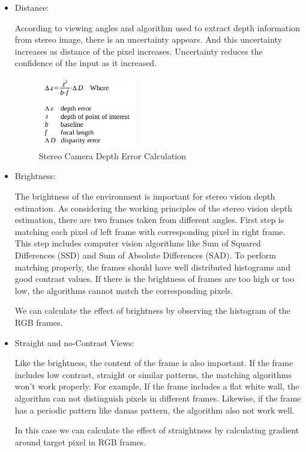 \documentclass[12pt]{article}
\begin{document}
\begin{itemize}
    \item Distance:

          According to viewing angles and algorithm used to extract depth information from stereo image, there is an uncertainty appears. And this uncertainty increases as distance of the pixel increases. Uncertainty reduces the confidence of the input as it increased.

          \begin{figure}[H]
              \centering
              \includegraphics[width=0.4\textwidth]{CamDistance.png}
              \caption{Stereo Camera Depth Error Calculation~\cite{DisparityCalculator, gallup2008variable}}
          \end{figure}

    \item Brightness:

          The brightness of the environment is important for stereo vision depth estimation. As considering the working principles of the stereo vision depth estimation, there are two frames taken from different angles. First step is matching each pixel of left frame with corresponding pixel in right frame. This step includes computer vision algorithms like Sum of Squared Differences (SSD) and Sum of Absolute Differences (SAD). To perform matching properly, the frames should have well distributed histograms and good contrast values. If there is the brightness of frames are too high or too low, the algorithms cannot match the corresponding pixels.

          We can calculate the effect of brightness by observing the histogram of the RGB frames.
    \item Straight and no-Contrast Views:

          Like the brightness, the content of the frame is also important. If the frame includes low contrast, straight or similar patterns, the matching algorithms won’t work properly. For example, If the frame includes a flat white wall, the algorithm can not distinguish pixels in different frames. Likewise, if the frame has a periodic pattern like damas pattern, the algorithm also not work well.

          In this case we can calculate the effect of straightness by calculating gradient around target pixel in RGB frames.
\end{itemize}
\end{document}
